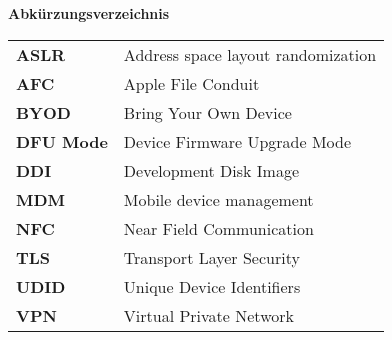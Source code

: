 %
%
% 
% 
% 

\begin{center}
{\Large\bfseries Abkürzungsverzeichnis}
\end{center}

\begin{table*}[htbp]
		\begin{tabular}{ll}
		     \textbf{ASLR} & Address space layout randomization \\
		     \textbf{AFC} & Apple File Conduit\\
		     \textbf{BYOD} & Bring Your Own Device\\
		     \textbf{DFU Mode} & Device Firmware Upgrade Mode\\
		     \textbf{DDI} & Development Disk Image \\
		     \textbf{MDM} & Mobile device management \\
		     \textbf{NFC} & Near Field Communication \\
 		     \textbf{TLS}  & Transport Layer Security \\
 		     \textbf{UDID} & Unique Device Identifiers\\
 		 	 \textbf{VPN} & Virtual Private Network \\
		\end{tabular}
\end{table*}